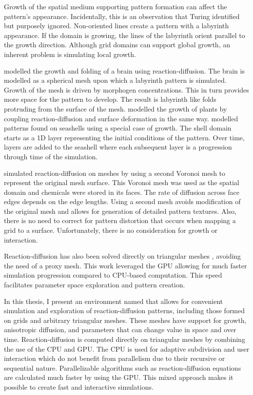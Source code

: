 Growth of the spatial medium supporting pattern formation can affect the pattern's appearance. Incidentally, this is an observation that Turing identified but purposely ignored. Non-oriented lines create a pattern with a labyrinth appearance. If the domain is growing, the lines of the labyrinth orient parallel to the growth direction. Although grid domains can support global growth, an inherent problem is simulating local growth. 

\citet{lefevre2010} modelled the growth and folding of a brain using reaction-diffusion. The brain is modelled as a spherical mesh upon which a labyrinth pattern is simulated. Growth of the mesh is driven by morphogen concentrations. This in turn provides more space for the pattern to develop. The result is labyrinth like folds protruding from the surface of the mesh. \citet{harrison2002, holloway2007} modelled the growth of plants by coupling reaction-diffusion and surface deformation in the same way. \citet{fowler1992} modelled patterns found on seashells using a special case of growth. The shell domain starts as a 1D layer representing the initial conditions of the pattern. Over time, layers are added to the seashell where each subsequent layer is a progression through time of the simulation.

\citet{turk1991} simulated reaction-diffusion on meshes by using a second Voronoi mesh to represent the original mesh surface. This Voronoi mesh was used as the spatial domain and chemicals were stored in its faces. The rate of diffusion across face edges depends on the edge lengths. Using a second mesh avoids modification of the original mesh and allows for generation of detailed pattern textures. Also, there is no need to correct for pattern distortion that occurs when mapping a grid to a surface. Unfortunately, there is no consideration for growth or interaction. %

Reaction-diffusion has also been solved directly on triangular meshes \citep{descombes2016}, avoiding the need of a proxy mesh. This work leveraged the GPU allowing for much faster simulation progression compared to CPU-based computation. This speed facilitates parameter space exploration and pattern creation. 

In this thesis, I present an environment named \ProgramName{} that allows for convenient simulation and exploration of reaction-diffusion patterns, including those formed on grids and arbitrary triangular meshes. These meshes have support for growth, anisotropic diffusion, and parameters that can change value in space and over time. Reaction-diffusion is computed directly on triangular meshes by combining the use of the CPU and GPU. The CPU is used for adaptive subdivision and user interaction which do not benefit from parallelism due to their recursive or sequential nature. Parallelizable algorithms such as reaction-diffusion equations are calculated much faster by using the GPU. This mixed approach makes it possible to create fast and interactive simulations. 

